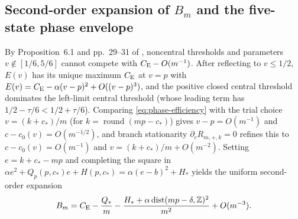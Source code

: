 \subsection{Second-order expansion of $B_m$ and the five-state phase envelope}

By Proposition~6.1 and pp.~29--31 of \citet{Schulz2016}, noncentral thresholds
and parameters $v\notin[1/6,5/6]$ cannot compete with $C_{\mathrm E}-O(m^{-1})$. After
reflecting to $v\le1/2$, $E(v)$ has its unique maximum $C_{\mathrm E}$ at $v=p$ with
$E(v)=C_{\mathrm E}-\alpha(v-p)^2+O((v-p)^3)$, and the positive closed central
threshold dominates the left-limit central threshold (whose leading term has
$1/2-\tau/6<1/2+\tau/6$). Comparing \eqref{eq:phase-efficiency} with the
trial choice $v=(k+c_*)/m$ (for $k=\operatorname{round}(mp-c_*)$) gives
$v-p=O(m^{-1})$ and $c-c_0(v)=O(m^{-1/2})$, and branch stationarity
$\partial_c R_{m,+,k}=0$ refines this to $c-c_0(v)=O(m^{-1})$ and
$v=(k+c_*)/m+O(m^{-2})$. Setting $e=k+c_*-mp$ and completing the square in
$\alpha e^2+Q_p(p,c_*)e+H(p,c_*)=\alpha(e-b)^2+H_*$ yields the uniform
second-order expansion
\begin{equation}\label{eq:phase-bm}
 B_m=C_{\mathrm E}-\frac{Q_*}m-\frac{H_*+
 \alpha\operatorname{dist}(mp-\delta,\mathbb Z)^2}{m^2}+O(m^{-3}).
\end{equation}

